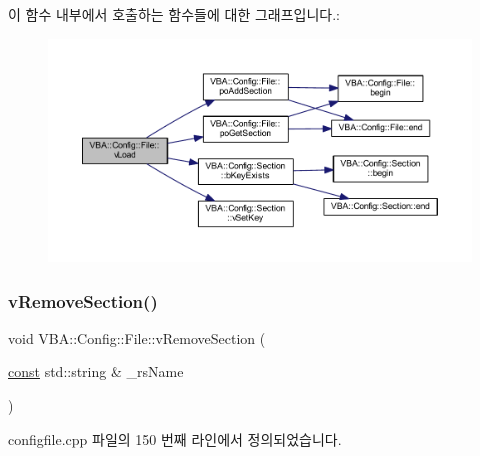 이 함수 내부에서 호출하는 함수들에 대한 그래프입니다.\+:
\nopagebreak
\begin{figure}[H]
\begin{center}
\leavevmode
\includegraphics[width=350pt]{class_v_b_a_1_1_config_1_1_file_ac70f83e5efe3c2d7a66de7227099803b_cgraph}
\end{center}
\end{figure}
\mbox{\label{class_v_b_a_1_1_config_1_1_file_a4b9de49a799dc1e4de38710669127710}} 
\subsubsection{\texorpdfstring{v\+Remove\+Section()}{vRemoveSection()}}
{\footnotesize\ttfamily void V\+B\+A\+::\+Config\+::\+File\+::v\+Remove\+Section (\begin{DoxyParamCaption}\item[{\mbox{\hyperlink{getopt1_8c_a2c212835823e3c54a8ab6d95c652660e}{const}} std\+::string \&}]{\+\_\+rs\+Name }\end{DoxyParamCaption})}



configfile.\+cpp 파일의 150 번째 라인에서 정의되었습니다.


